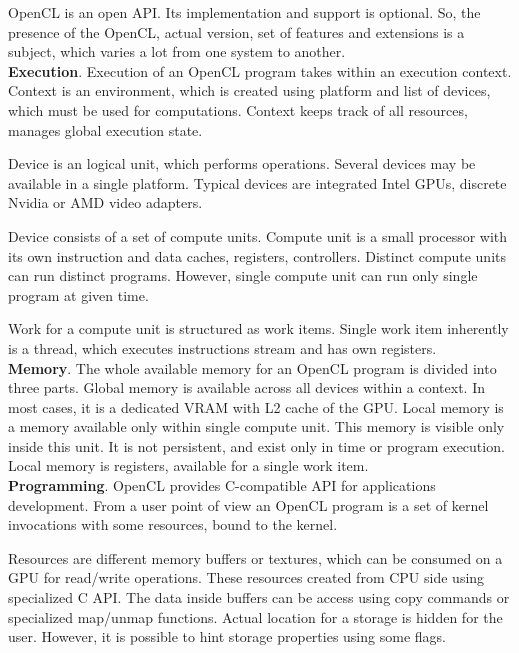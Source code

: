 OpenCL is an open API. Its implementation and support is optional. So, the presence of the OpenCL, actual version, set of features and extensions is a subject, which varies a lot from one system to another.\\

\textbf{Execution}. Execution of an OpenCL program takes within an execution context. Context is an environment, which is created using platform and list of devices, which must be used for computations. Context keeps track of all resources, manages global execution state.

Device is an logical unit, which performs operations. Several devices may be available in a single platform. Typical devices are integrated Intel GPUs, discrete Nvidia or AMD video adapters.

Device consists of a set of compute units. Compute unit is a small processor with its own instruction and data caches, registers, controllers. Distinct compute units can run distinct programs. However, single compute unit can run only single program at given time.

Work for a compute unit is structured as work items. Single work item inherently is a thread, which executes instructions stream and has own registers.\\

\textbf{Memory}. The whole available memory for an OpenCL program is divided into three parts. Global memory is available across all devices within a context. In most cases, it is a dedicated VRAM with L2 cache of the GPU. Local memory is a memory available only within single compute unit. This memory is visible only inside this unit. It is not persistent, and exist only in time or program execution. Local memory is registers, available for a single work item.\\

\textbf{Programming}. OpenCL provides C-compatible API for applications development. From a user point of view an OpenCL program is a set of kernel invocations with some resources, bound to the kernel. 

Resources are different memory buffers or textures, which can be consumed on a GPU for read/write operations. These resources created from CPU side using specialized C API. The data inside buffers can be access using copy commands or specialized map/unmap functions. Actual location for a storage is hidden for the user. However, it is possible to hint storage properties using some flags.

